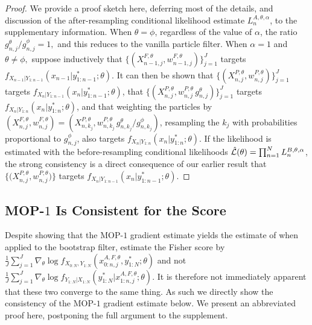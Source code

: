 \documentclass[9pt,twocolumn,pnasresearcharticle]{pnas-new}
\newcommand\arxiv[2]{#2} %
\begin{document}

\begin{proof}
    We provide a proof sketch here, deferring most of the details, and discussion of the after-resampling conditional likelihood estimate $L_n^{A,\theta,\alpha}$, to \arxiv{Appendix~\ref{appendix:targeting}}{the supplementary information}. 
    When $\theta=\phi$, regardless of the value of $\alpha$, the ratio ${g_{n,j}^\theta}/{g_{n,j}^\phi}=1,$ and this reduces to the vanilla particle filter.
    When $\alpha=1$ and $\theta\neq\phi,$ suppose inductively that $\{(X^{F,\theta}_{n-1,j},w^{F,\theta}_{n-1,j})\}_{j=1}^J$ targets $f_{X_{n-1}|Y_{1:n-1}}(x_{n-1}|y^*_{1:n-1};\theta)$.
    It can then be shown that $\{(X^{P,\theta}_{n,j},w^{P,\theta}_{n,j})\}_{j=1}^J$ targets $f_{X_{n}|Y_{1:n-1}}(x_{n}|y^*_{1:n-1};\theta)$, that $\{(X^{P,\theta}_{n,j},w^{P,\theta}_{n,j} \, g^\theta_{n,j} )\}_{j=1}^J$ targets  $f_{X_{n}|Y_{1:n}}(x_{n}|y^*_{1:n};\theta)$, and that weighting the particles by $(X^{F,\theta}_{n,j},w^{F,\theta}_{n,j}) = (X^{P,\theta}_{n,k_j}, w^{P,\theta}_{n,k_j} \, g^\theta_{n,k_j} \big/ g^\phi_{n,k_j})$,
    resampling the $k_j$ with probabilities proportional to $g^\phi_{n,j}$, also targets $f_{X_{n}|Y_{1:n}}(x_{n}|y^*_{1:n};\theta)$.
    If the likelihood is estimated with the before-resampling conditional likelihoods $\hat{\mathcal{L}}(\theta) = \prod_{n=1}^N L_n^{B,\theta,\alpha}$, the strong consistency is a direct consequence of our earlier result that $\{ \big(X^{P,\theta}_{n,j},w^{P,\theta}_{n,j}\big) \}$ targets $f_{X_{n}|Y_{1:n-1}}(x_{n}|y^*_{1:n-1};\theta)$. 
\end{proof}




\subsection{MOP-$1$ Is Consistent for the Score}

Despite showing that the MOP-$1$ gradient estimate yields the estimate of \cite{poyiadjis11, scibior21} when applied to the bootstrap filter, \cite{poyiadjis11, scibior21} estimate the Fisher score by 
$\frac{1}{J}\sum_{j=1}^J \nabla_\theta \log f_{X_{0:N}, Y_{1:N}}\left(x_{0:n,j}^{A, F,\theta}, y_{1:N}^* ; \theta\right)$ and not
$\frac{1}{J}\sum_{j=1}^J \nabla_\theta \log f_{Y_{1:N}| X_{1:N}}\left(y_{1:N}^* | x_{1:n,j}^{A, F,\theta}; \theta\right).$
It is therefore not immediately apparent that these two converge to the same thing. As such we directly show the consistency of the MOP-$1$ gradient estimate below. 
We present an abbreviated proof here, postponing the full argument to \arxiv{Appendix~\ref{appendix:consistency}}{the supplement}.
\end{document}
